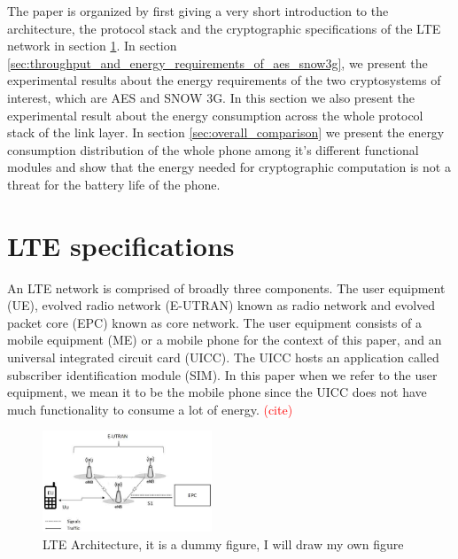 The paper is organized by first giving a very short introduction to the architecture, the protocol stack and the cryptographic specifications of the LTE network in section \ref{sec:lte_specifications}. In section \ref{sec:throughput_and_energy_requirements_of_aes_snow3g}, we present the experimental results about the energy requirements of the two cryptosystems of interest, which are AES and SNOW 3G. In this section we also present the experimental result about the energy consumption across the whole protocol stack of the link layer. In section \ref{sec:overall_comparison} we present the energy consumption distribution of the whole phone among it's different functional modules and show that the energy needed for cryptographic computation is not a threat for the battery life of the phone. 


\section{LTE specifications}
\label{sec:lte_specifications}
An LTE network is comprised of broadly three components. The user equipment (UE), evolved radio network (E-UTRAN) known as radio network and evolved packet core (EPC) known as core network. The user equipment consists of a mobile equipment (ME) or a mobile phone for the context of this paper, and an universal integrated circuit card (UICC). The UICC hosts an application called subscriber identification module (SIM). In this paper when we refer to the user equipment, we mean it to be the mobile phone since the UICC does not have much functionality to consume a lot of energy. \textcolor{red}{(cite)}

\begin{figure}
  \includegraphics[width=0.45\textwidth]{lte_architecture.jpg}
\caption{LTE Architecture, it is a dummy figure, I will draw my own figure}
\label{fig:protocl_stack}       %
\end{figure}

